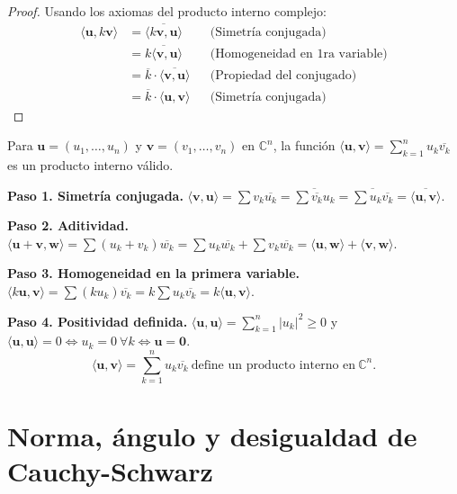 \begin{proof} Usando los axiomas del producto interno complejo:
    \begin{align*}
        \langle \mathbf{u}, k\mathbf{v} \rangle 
        &= \overline{\langle k\mathbf{v}, \mathbf{u} \rangle} && \text{(Simetría conjugada)} \\
        &= \overline{k \langle \mathbf{v}, \mathbf{u} \rangle} && \text{(Homogeneidad en 1ra variable)} \\
        &= \overline{k} \cdot \overline{\langle \mathbf{v}, \mathbf{u} \rangle} && \text{(Propiedad del conjugado)} \\
        &= \overline{k} \cdot \langle \mathbf{u}, \mathbf{v} \rangle && \text{(Simetría conjugada)}
    \end{align*}
\end{proof}

\begin{example}
Para $\mathbf{u} = (u_1,\dots,u_n)$ y $\mathbf{v} = (v_1,\dots,v_n)$ en $\mathbb{C}^n$, la función $\langle \mathbf{u}, \mathbf{v} \rangle = \sum_{k=1}^n u_k \overline{v_k}$ es un producto interno válido.
\begin{myproof}
\textbf{Paso 1. Simetría conjugada.}
$\langle \mathbf{v}, \mathbf{u} \rangle = \sum v_k \overline{u_k} = \overline{\sum \overline{v_k} u_k} = \overline{\sum u_k \overline{v_k}} = \overline{\langle \mathbf{u}, \mathbf{v} \rangle}$.

\textbf{Paso 2. Aditividad.}
$\langle \mathbf{u} + \mathbf{v}, \mathbf{w} \rangle = \sum (u_k + v_k)\overline{w_k} = \sum u_k\overline{w_k} + \sum v_k\overline{w_k} = \langle \mathbf{u}, \mathbf{w} \rangle + \langle \mathbf{v}, \mathbf{w} \rangle$.

\textbf{Paso 3. Homogeneidad en la primera variable.}
$\langle k\mathbf{u}, \mathbf{v} \rangle = \sum (ku_k)\overline{v_k} = k \sum u_k \overline{v_k} = k\langle \mathbf{u}, \mathbf{v} \rangle$.

\textbf{Paso 4. Positividad definida.}
$\langle \mathbf{u}, \mathbf{u} \rangle = \sum_{k=1}^n |u_k|^2 \geq 0$ y $\langle \mathbf{u}, \mathbf{u} \rangle = 0 \iff u_k=0\ \forall k \iff \mathbf{u}=\mathbf{0}$.
$$\boxed{\langle \mathbf{u}, \mathbf{v} \rangle = \sum_{k=1}^n u_k \overline{v_k}\ \text{define un producto interno en}\ \mathbb{C}^n.}$$
\end{myproof}
\end{example}


\section{Norma, ángulo y desigualdad de Cauchy-Schwarz}

